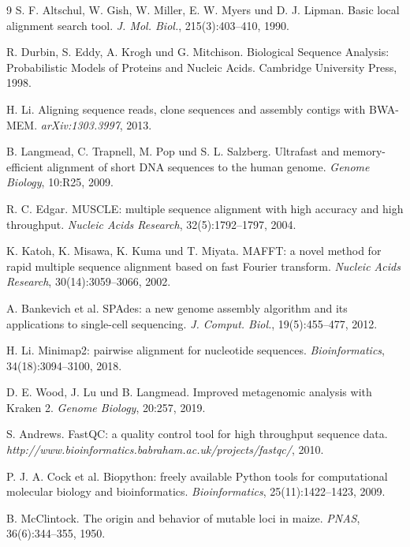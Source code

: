 ﻿\documentclass[a4paper,12pt]{article}
\theoremstyle{definition}
\begin{document}
\begin{thebibliography}{9}
    S. F. Altschul, W. Gish, W. Miller, E. W. Myers und D. J. Lipman.
    Basic local alignment search tool.
    \textit{J. Mol. Biol.}, 215(3):403--410, 1990.

    R. Durbin, S. Eddy, A. Krogh und G. Mitchison.
    Biological Sequence Analysis: Probabilistic Models of Proteins and Nucleic Acids.
    Cambridge University Press, 1998.

    H. Li.
    Aligning sequence reads, clone sequences and assembly contigs with BWA-MEM.
    \textit{arXiv:1303.3997}, 2013.

    B. Langmead, C. Trapnell, M. Pop und S. L. Salzberg.
    Ultrafast and memory-efficient alignment of short DNA sequences to the human genome.
    \textit{Genome Biology}, 10:R25, 2009.

    R. C. Edgar.
    MUSCLE: multiple sequence alignment with high accuracy and high throughput.
    \textit{Nucleic Acids Research}, 32(5):1792--1797, 2004.

    K. Katoh, K. Misawa, K. Kuma und T. Miyata.
    MAFFT: a novel method for rapid multiple sequence alignment based on fast Fourier transform.
    \textit{Nucleic Acids Research}, 30(14):3059--3066, 2002.

    A. Bankevich et al.
    SPAdes: a new genome assembly algorithm and its applications to single-cell sequencing.
    \textit{J. Comput. Biol.}, 19(5):455--477, 2012.

    H. Li.
    Minimap2: pairwise alignment for nucleotide sequences.
    \textit{Bioinformatics}, 34(18):3094--3100, 2018.

    D. E. Wood, J. Lu und B. Langmead.
    Improved metagenomic analysis with Kraken 2.
    \textit{Genome Biology}, 20:257, 2019.

    S. Andrews.
    FastQC: a quality control tool for high throughput sequence data.
    \textit{http://www.bioinformatics.babraham.ac.uk/projects/fastqc/}, 2010.

    P. J. A. Cock et al.
    Biopython: freely available Python tools for computational molecular biology and bioinformatics.
    \textit{Bioinformatics}, 25(11):1422--1423, 2009.

    B. McClintock.
    The origin and behavior of mutable loci in maize.
    \textit{PNAS}, 36(6):344--355, 1950.


\end{thebibliography}
\end{document}
